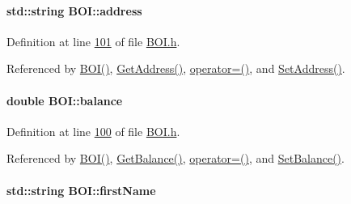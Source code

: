 \paragraph[{\texorpdfstring{address}{address}}]{\setlength{\rightskip}{0pt plus 5cm}std\+::string B\+O\+I\+::address\hspace{0.3cm}{\ttfamily [private]}}\hypertarget{class_b_o_i_ab9315fe76fd9f07551f5ae7899d33516_ab9315fe76fd9f07551f5ae7899d33516}{}\label{class_b_o_i_ab9315fe76fd9f07551f5ae7899d33516_ab9315fe76fd9f07551f5ae7899d33516}


Definition at line \hyperlink{_b_o_i_8h_source_l00101}{101} of file \hyperlink{_b_o_i_8h_source}{B\+O\+I.\+h}.



Referenced by \hyperlink{_b_o_i_8h_source_l00024}{B\+O\+I()}, \hyperlink{_b_o_i_8cpp_source_l00062}{Get\+Address()}, \hyperlink{_b_o_i_8h_source_l00065}{operator=()}, and \hyperlink{_b_o_i_8cpp_source_l00058}{Set\+Address()}.

\paragraph[{\texorpdfstring{balance}{balance}}]{\setlength{\rightskip}{0pt plus 5cm}double B\+O\+I\+::balance\hspace{0.3cm}{\ttfamily [private]}}\hypertarget{class_b_o_i_aa00a3d8baf3420647c40119b7fa4ed6f_aa00a3d8baf3420647c40119b7fa4ed6f}{}\label{class_b_o_i_aa00a3d8baf3420647c40119b7fa4ed6f_aa00a3d8baf3420647c40119b7fa4ed6f}


Definition at line \hyperlink{_b_o_i_8h_source_l00100}{100} of file \hyperlink{_b_o_i_8h_source}{B\+O\+I.\+h}.



Referenced by \hyperlink{_b_o_i_8h_source_l00024}{B\+O\+I()}, \hyperlink{_b_o_i_8cpp_source_l00070}{Get\+Balance()}, \hyperlink{_b_o_i_8h_source_l00065}{operator=()}, and \hyperlink{_b_o_i_8cpp_source_l00066}{Set\+Balance()}.

\paragraph[{\texorpdfstring{first\+Name}{firstName}}]{\setlength{\rightskip}{0pt plus 5cm}std\+::string B\+O\+I\+::first\+Name\hspace{0.3cm}{\ttfamily [private]}}\hypertarget{class_b_o_i_a12872fd8c15dbf833f78862b00579ed1_a12872fd8c15dbf833f78862b00579ed1}{}\label{class_b_o_i_a12872fd8c15dbf833f78862b00579ed1_a12872fd8c15dbf833f78862b00579ed1}


